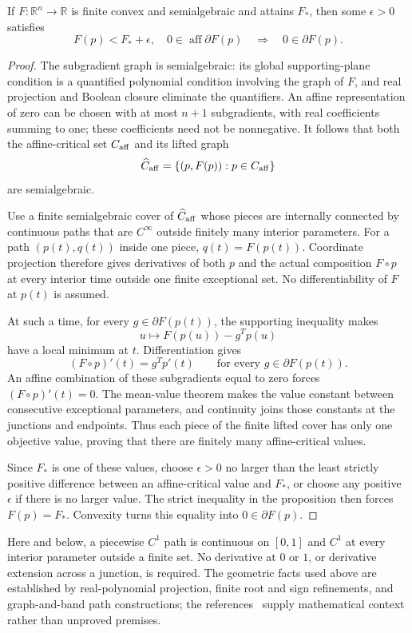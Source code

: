 \begin{proposition}\label{A:semialgebraic}
If $F:\mathbb R^n\to\mathbb R$ is finite convex and semialgebraic and attains $F_*$, then some $\epsilon>0$ satisfies
\[
 F(p)<F_*+\epsilon,\quad0\in\operatorname{aff}\partial F(p)
 \quad\Longrightarrow\quad0\in\partial F(p).
\]
\end{proposition}
\begin{proof}
The subgradient graph is semialgebraic: its global supporting-plane condition is a quantified polynomial condition involving the graph of $F$, and real projection and Boolean closure eliminate the quantifiers. An affine representation of zero can be chosen with at most $n+1$ subgradients, with real coefficients summing to one; these coefficients need not be nonnegative. It follows that both the affine-critical set $C_{\rm aff}$ and its lifted graph
\[
 \widehat C_{\rm aff}=\{(p,F(p)):p\in C_{\rm aff}\}
\]
are semialgebraic.

Use a finite semialgebraic cover of $\widehat C_{\rm aff}$ whose pieces are internally connected by continuous paths that are $C^\infty$ outside finitely many interior parameters. For a path $(p(t),q(t))$ inside one piece, $q(t)=F(p(t))$. Coordinate projection therefore gives derivatives of both $p$ and the actual composition $F\circ p$ at every interior time outside one finite exceptional set. No differentiability of $F$ at $p(t)$ is assumed.

At such a time, for every $g\in\partial F(p(t))$, the supporting inequality makes
\[
 u\longmapsto F(p(u))-g^Tp(u)
\]
have a local minimum at $t$. Differentiation gives
\[
 (F\circ p)'(t)=g^Tp'(t)\qquad\text{for every }g\in\partial F(p(t)).
\]
An affine combination of these subgradients equal to zero forces $(F\circ p)'(t)=0$. The mean-value theorem makes the value constant between consecutive exceptional parameters, and continuity joins those constants at the junctions and endpoints. Thus each piece of the finite lifted cover has only one objective value, proving that there are finitely many affine-critical values.

Since $F_*$ is one of these values, choose $\epsilon>0$ no larger than the least strictly positive difference between an affine-critical value and $F_*$, or choose any positive $\epsilon$ if there is no larger value. The strict inequality in the proposition then forces $F(p)=F_*$. Convexity turns this equality into $0\in\partial F(p)$.
\end{proof}
Here and below, a piecewise $C^1$ path is continuous on $[0,1]$ and $C^1$ at every interior parameter outside a finite set. No derivative at $0$ or $1$, or derivative extension across a junction, is required. The geometric facts used above are established by real-polynomial projection, finite root and sign refinements, and graph-and-band path constructions; the references~\cite{SA,BDLS} supply mathematical context rather than unproved premises.

